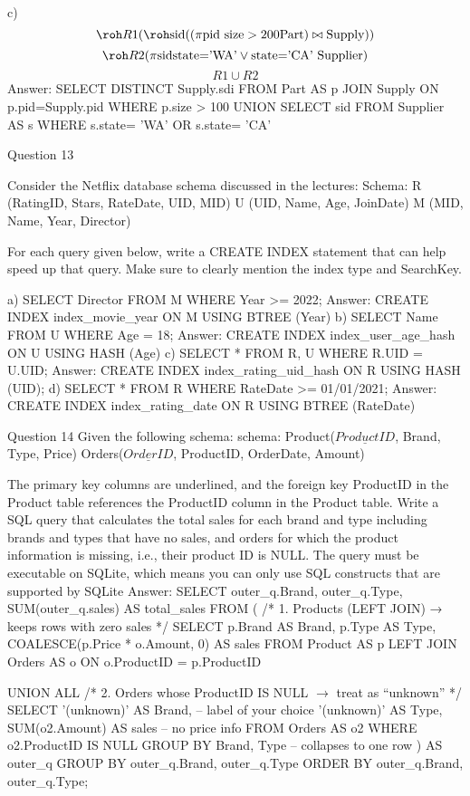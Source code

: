   c) $$\roh R1(\roh \text{sid}(( \pi \text{pid size}>200 \text{Part}) \bowtie \text{Supply}))$$
     $$\roh R2(\pi \text{sidstate='WA'} \vee \text{state='CA' Supplier})$$
     $$R1 \cup R2$$
    Answer:
    SELECT DISTINCT Supply.sdi
    FROM Part AS p
    JOIN Supply ON p.pid=Supply.pid
    WHERE p.size > 100
    UNION
    SELECT sid
    FROM Supplier AS s
    WHERE s.state= 'WA' OR s.state= 'CA'

  Question 13

  Consider the Netflix database schema discussed in the lectures:
  Schema:
    R (RatingID, Stars, RateDate, UID, MID)
    U (UID, Name, Age, JoinDate)
    M (MID, Name, Year, Director)

  For each query given below, write a CREATE INDEX statement that can help speed up that query. Make sure to clearly mention the index type and SearchKey.

  a) SELECT Director FROM M WHERE Year >= 2022;
    Answer:
    CREATE INDEX index_movie_year ON M USING BTREE (Year)
  b) SELECT Name FROM U WHERE Age = 18;
    Answer:
    CREATE INDEX index_user_age_hash ON U USING HASH (Age)
  c) SELECT * FROM R, U WHERE R.UID = U.UID;
    Answer:
    CREATE INDEX index_rating_uid_hash ON R USING HASH (UID);
  d) SELECT * FROM R WHERE RateDate >= 01/01/2021;
    Answer:
    CREATE INDEX index_rating_date ON R USING BTREE (RateDate)

  Question 14
  Given the following schema:
    schema:
    Product($\underline{ProductID}$, Brand, Type, Price)
    Orders($\underline{OrderID}$, ProductID, OrderDate, Amount)

  The primary key columns are underlined, and the foreign key ProductID in the Product table references the ProductID column in the Product table.
  Write a SQL query that calculates the total sales for each brand and type including brands and  types that have no sales, and orders for which the product information is missing, i.e., their product ID is NULL. The query must be executable on SQLite, which means you can only use SQL constructs that are supported by SQLite
  Answer:
    SELECT outer_q.Brand, outer_q.Type, SUM(outer_q.sales) AS total_sales
    FROM (
    /* 1. Products (LEFT JOIN) → keeps rows with zero sales  */
        SELECT p.Brand AS Brand,
               p.Type AS Type,
               COALESCE(p.Price * o.Amount, 0) AS sales
          FROM   Product AS p
          LEFT JOIN Orders  AS o
               ON  o.ProductID = p.ProductID

         UNION ALL
    /* 2. Orders whose ProductID IS NULL $\rightarrow$ treat as “unknown” */
        SELECT '(unknown)' AS Brand, -- label of your choice
               '(unknown)' AS Type,
                SUM(o2.Amount) AS sales -- no price info
          FROM  Orders AS o2
         WHERE  o2.ProductID IS NULL
         GROUP  BY Brand, Type -- collapses to one row
         ) AS outer_q
    GROUP BY outer_q.Brand, outer_q.Type
    ORDER BY outer_q.Brand, outer_q.Type;

